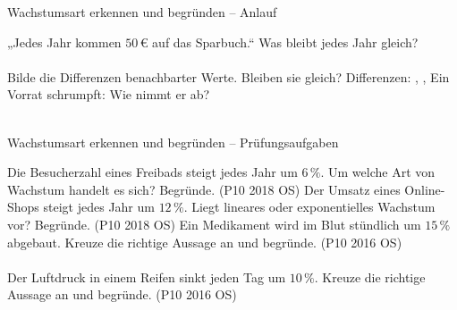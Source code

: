 \setcounter{aufgabe}{30}

\begin{aufgabe}{Wachstumsart erkennen und begründen – Anlauf}
\begin{teile}
\teil „Jedes Jahr kommen $50\,€$ auf das Sparbuch.“ Was bleibt jedes Jahr gleich? \\  \\ 
\teil Bilde die Differenzen benachbarter Werte. Bleiben sie gleich?  Differenzen: \leerfeld , \leerfeld , \leerfeld
\teil Ein Vorrat schrumpft:  Wie nimmt er ab? \\  \\ 
\end{teile}
\end{aufgabe}

\begin{aufgabe}{Wachstumsart erkennen und begründen – Prüfungsaufgaben}
\begin{teile}
\steil Die Besucherzahl eines Freibads steigt jedes Jahr um $6\,\%$.  Um welche Art von Wachstum handelt es sich? Begründe. \hfill (P10 2018 OS)
\steil Der Umsatz eines Online-Shops steigt jedes Jahr um $12\,\%$.  Liegt lineares oder exponentielles Wachstum vor? Begründe. \hfill (P10 2018 OS)
\steil Ein Medikament wird im Blut stündlich um $15\,\%$ abgebaut.  Kreuze die richtige Aussage an und begründe. \hfill (P10 2016 OS) \\  \\ 
\steil Der Luftdruck in einem Reifen sinkt jeden Tag um $10\,\%$.  Kreuze die richtige Aussage an und begründe. \hfill (P10 2016 OS) \\  \\ 
\end{teile}
\end{aufgabe}

